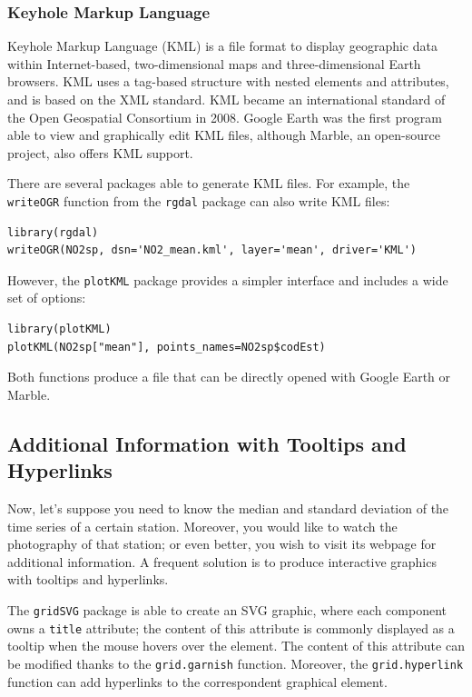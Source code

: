 \documentclass[smallroyalvopaper]{memoir}
\begin{document}
\subsubsection{Keyhole Markup Language}
\label{sec-1-6-2}

Keyhole Markup Language (KML) is a file format to display geographic
data within Internet-based, two-dimensional maps and three-dimensional
Earth browsers. KML uses a tag-based structure with nested elements
and attributes, and is based on the XML standard. KML became an
international standard of the Open Geospatial Consortium
in 2008. Google Earth was the first program able to view and
graphically edit KML files, although Marble, an open-source project,
also offers KML support.


There are several packages able to generate KML files. For example,
the \texttt{writeOGR} function from the \texttt{rgdal} package can also write KML
files:
\lstset{language=R,numbers=none}
\begin{lstlisting}
library(rgdal)
writeOGR(NO2sp, dsn='NO2_mean.kml', layer='mean', driver='KML')
\end{lstlisting}

However, the \texttt{plotKML} package provides a simpler interface and
includes a wide set of options:
\lstset{language=R,numbers=none}
\begin{lstlisting}
library(plotKML)
plotKML(NO2sp["mean"], points_names=NO2sp$codEst)
\end{lstlisting}

Both functions produce a file that can be directly opened with Google
Earth or Marble.
\subsection{\floweroneleft Additional Information with Tooltips and Hyperlinks}
\label{sec-1-7}
Now, let's suppose you need to know the median and standard deviation
of the time series of a certain station. Moreover, you would like to
watch the photography of that station; or even better, you wish to visit
its webpage for additional information. A frequent solution is to
produce interactive graphics with tooltips and hyperlinks.

The \texttt{gridSVG} package is able to create an SVG graphic, where each
component owns a \texttt{title} attribute; the content of this attribute is
commonly displayed as a tooltip when the mouse hovers over the
element. The content of this attribute can be modified thanks to the
\texttt{grid.garnish} function. Moreover, the \texttt{grid.hyperlink} function can
add hyperlinks to the correspondent graphical element.
\end{document}
